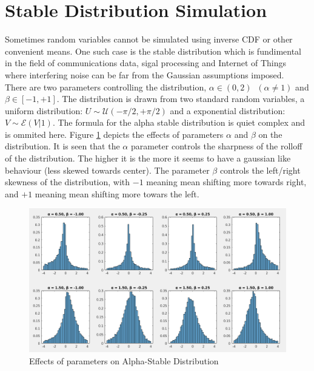 \documentclass{article}
\begin{document}
\section{Stable Distribution Simulation}
Sometimes random variables cannot be simulated using inverse CDF or other convenient means. One such case is the stable distribution which is fundimental in the field of communications data, sigal processing and Internet of Things where interfering noise can be far from the Gaussian assumptions imposed.\\
There are two parameters controlling the distribution, $\alpha \in (0,2)\;\; (\alpha \neq 1)$ and $\beta \in [-1,+1]$. The distribution is drawn from two standard random variables, a uniform distribution: $U\sim \mathcal{U}(-\pi/2,+\pi/2)$ and a exponential distribution: $V\sim \mathcal{E}(V|1)$. The formula for the alpha stable distribution is quiet complex and is ommited here. Figure \ref{fig:stable} depicts the effects of parameters $\alpha$ and $\beta$ on the distribution. It is seen that the $\alpha$ parameter controls the sharpness of the rolloff of the distribution. The higher it is the more it seems to have a gaussian like behaviour (less skewed towards center). The parameter $\beta$ controls the left/right skewness of the distribution, with $-1$ meaning mean shifting more towards right, and $+1$ meaning mean shifting more towars the left.
\begin{figure}[htp]
 \centering
 \includegraphics[width=0.9\linewidth]{task_6.png}
 \caption{Effects of parameters on Alpha-Stable Distribution}
 \label{fig:stable}
\end{figure}
\end{document}
